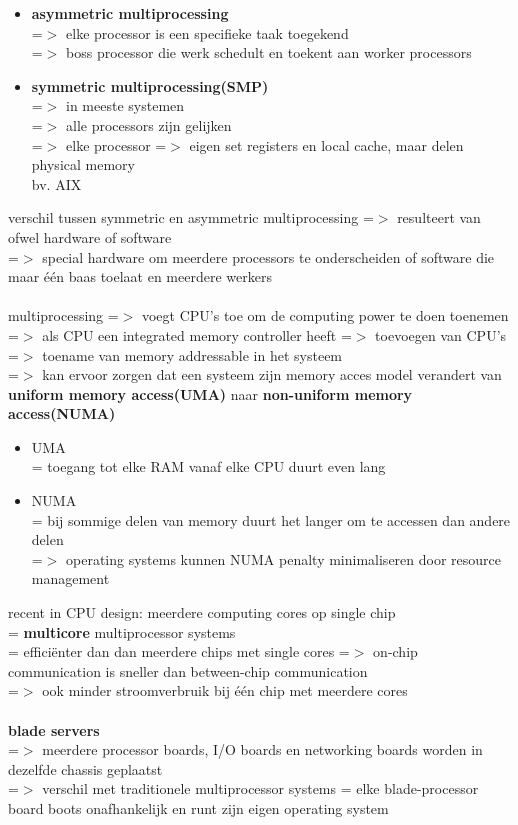 \documentclass{report}
\begin{document}
\begin{itemize}
\item \textbf{asymmetric multiprocessing}
\\=$>$ elke processor is een specifieke taak toegekend
\\=$>$ boss processor die werk schedult en toekent aan worker processors
\item \textbf{symmetric multiprocessing(SMP)}
\\=$>$ in meeste systemen
\\=$>$ alle processors zijn gelijken
\\=$>$ elke processor =$>$ eigen set registers en local cache, maar delen physical memory
\\bv. AIX
\end{itemize}
verschil tussen symmetric en asymmetric multiprocessing =$>$ resulteert van ofwel hardware of software
\\=$>$ special hardware om meerdere processors te onderscheiden of software die maar \'e\'en baas toelaat en meerdere werkers
\\
\\multiprocessing =$>$ voegt CPU's toe om de computing power te doen toenemen
\\=$>$ als CPU een integrated memory controller heeft =$>$ toevoegen van CPU's =$>$ toename van memory addressable in het systeem 
\\=$>$ kan ervoor zorgen dat een systeem zijn memory acces model verandert van \textbf{uniform memory access(UMA)} naar \textbf{non-uniform memory access(NUMA)}
\begin{itemize}
\item UMA
\\= toegang tot elke RAM vanaf elke CPU duurt even lang
\item NUMA
\\= bij sommige delen van memory duurt het langer om te accessen dan andere delen
\\=$>$ operating systems kunnen NUMA penalty minimaliseren door resource management
\end{itemize}
recent in CPU design: meerdere computing cores op single chip
\\= \textbf{multicore} multiprocessor systems
\\= effici\"enter dan dan meerdere chips met single cores =$>$ on-chip communication is sneller dan between-chip communication
\\=$>$ ook minder stroomverbruik bij \'e\'en chip met meerdere cores
\\
\\\textbf{blade servers}
\\=$>$ meerdere processor boards, I/O boards en networking boards worden in dezelfde chassis geplaatst
\\=$>$ verschil met traditionele multiprocessor systems = elke blade-processor board boots onafhankelijk en runt zijn eigen operating system 
\end{document}
